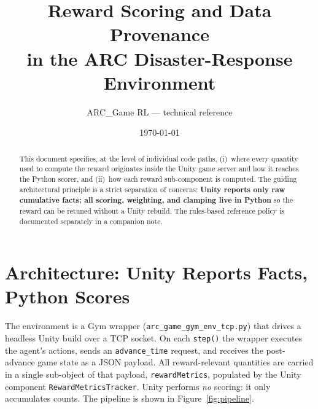 \documentclass[11pt]{article}
\title{\textbf{Reward Scoring and Data Provenance\\ in the ARC Disaster-Response Environment}}
\author{ARC\_Game RL --- technical reference}
\date{\today}
\newcommand{\unity}[1]{{\color{unityblue}\texttt{\small #1}}}
\newcommand{\py}[1]{{\color{pyorange}\texttt{\small #1}}}
\begin{document}
\maketitle

\begin{abstract}
\noindent This document specifies, at the level of individual code paths, (i)~where every
quantity used to compute the reward originates inside the Unity game server and how it reaches
the Python scorer, and (ii)~how each reward sub-component is computed. The guiding architectural
principle is a strict separation of concerns: \textbf{Unity reports only raw cumulative facts;
all scoring, weighting, and clamping live in Python} so the reward can be retuned without a Unity
rebuild. The rules-based reference policy is documented separately in a companion note.
\end{abstract}

\tableofcontents
\vspace{1em}

\section{Architecture: Unity Reports Facts, Python Scores}

The environment is a Gym wrapper (\py{arc\_game\_gym\_env\_tcp.py}) that drives a headless Unity
build over a TCP socket. On each \py{step()} the wrapper executes the agent's actions, sends an
\unity{advance\_time} request, and receives the post-advance game state as a JSON payload. All
reward-relevant quantities are carried in a single sub-object of that payload,
\unity{rewardMetrics}, populated by the Unity component \unity{RewardMetricsTracker}. Unity
performs \emph{no} scoring: it only accumulates counts. The pipeline is shown in
Figure~\ref{fig:pipeline}.
\end{document}
